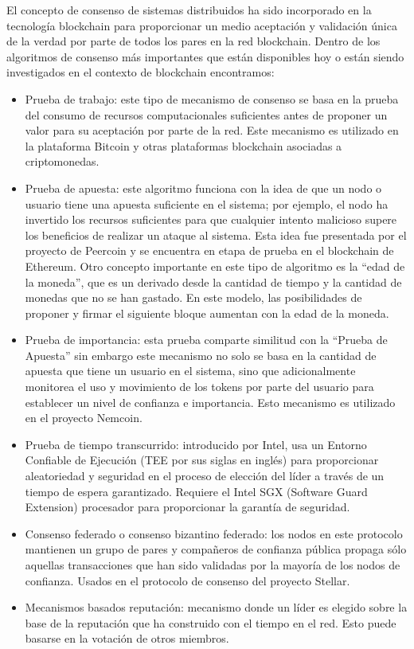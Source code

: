 El concepto de consenso de sistemas distribuidos ha sido incorporado  en la tecnología blockchain para proporcionar un medio aceptación y validación única de la verdad por parte de todos los pares en la red blockchain. Dentro de los algoritmos de consenso más importantes que están disponibles hoy o están siendo investigados en el contexto de blockchain encontramos:

\begin{itemize}
\item Prueba de trabajo: este tipo de mecanismo de consenso se basa en la prueba del consumo de recursos computacionales suficientes  antes de proponer un valor para su aceptación por parte de la red. Este mecanismo es utilizado en la plataforma Bitcoin  y otras plataformas blockchain asociadas a criptomonedas.
\item Prueba de apuesta: este algoritmo funciona con la idea de que un nodo o usuario tiene una apuesta suficiente en el sistema; por ejemplo, el nodo ha invertido los recursos suficientes  para que cualquier intento malicioso supere los beneficios de realizar un ataque al sistema. Esta idea fue presentada por el proyecto de Peercoin y se encuentra en etapa de prueba  en el blockchain de Ethereum. Otro concepto importante en este tipo de algoritmo es la “edad de la moneda”, que es un derivado desde la cantidad de tiempo y la cantidad de monedas que no se han gastado. En este modelo, las posibilidades de proponer y firmar el siguiente bloque aumentan con la edad de la moneda.
\item Prueba de importancia: esta prueba comparte similitud con la “Prueba de Apuesta” sin embargo este mecanismo no solo se basa en la cantidad de  apuesta que tiene un usuario en el sistema, sino que adicionalmente monitorea el uso y movimiento de los tokens por parte del usuario para establecer un nivel de confianza e importancia. Esto mecanismo es utilizado en el proyecto Nemcoin.
\item Prueba de tiempo transcurrido: introducido por Intel, usa un Entorno Confiable de Ejecución (TEE por sus siglas en inglés) para proporcionar aleatoriedad y seguridad en el proceso de elección del líder a través de un tiempo de espera garantizado. Requiere el Intel SGX (Software Guard Extension) procesador para proporcionar la garantía de seguridad\cite{costan2016intel}.
\item Consenso federado o consenso bizantino federado: los nodos en este protocolo mantienen un grupo de pares y compañeros de confianza pública propaga sólo aquellas transacciones que han sido validadas por la mayoría de los nodos de confianza. Usados en el protocolo de consenso del proyecto Stellar.
\item Mecanismos basados  reputación: mecanismo donde un líder es elegido sobre la base de la reputación que ha construido con el tiempo en el red. Esto puede basarse en la votación de otros miembros.
\end{itemize}


